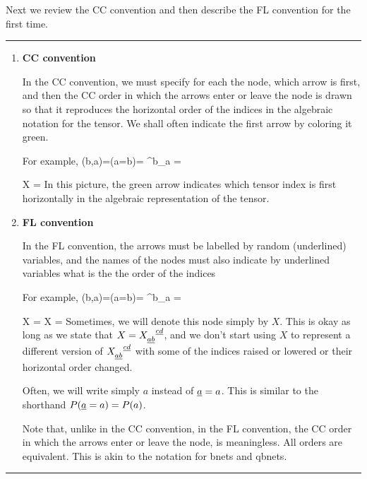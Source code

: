 Next we review 
the CC convention
and then describe the
FL convention for the first time. 
\hrule
\begin{enumerate}

\item {\bf CC convention}

In the CC convention,
we must specify for each the node, which arrow is first,
and then the CC 
order in which
the arrows 
enter or leave the node
is drawn so that it
reproduces 
the horizontal order
of the indices in the
algebraic notation for the tensor.
We shall often indicate the first arrow
by coloring it green.

For example,
\beq
\delta(b,a)=\indi(a=b)=
\delta^b_a =
\eeq


\beq
X
=
\bcen
{}\ecen
\eeq
In this picture, the
green arrow indicates
which tensor index is first
horizontally in the algebraic
representation of the tensor.

\item {\bf FL convention}

In the FL convention,
the arrows must be labelled
by random (underlined)
variables, and
the names of the nodes
must also indicate
by underlined variables
what is the the order of
the indices

For example,
\beq
\delta(b,a)=\indi(a=b)=
\delta^b_a =
\eeq


\beq
{}
X\indices{_\rva_\rvb^\rvc}
=
X
=
\bcen
{}\ecen
\eeq
Sometimes, 
we will denote
this node simply by $X$.
This is okay as long as
we state that $X=X\indices{_\rva_\rvb^\rvc^\rvd}$, and we 
don't start using $X$ 
to represent 
a different version of $X\indices{_\rva_\rvb^\rvc^\rvd}$
with some of the indices
raised or lowered or 
their horizontal order changed.

Often, we will
write simply $a$ instead
of $\rva=a$. This
is similar to
the shorthand
$P(\rva=a)=P(a)$.

Note that,
unlike in the CC 
convention, in the FL
convention, the CC 
order in which the
arrows enter or leave
the node, is meaningless.
All orders are  equivalent. This is
akin to the notation
for bnets and qbnets.


\end{enumerate}
\hrule

